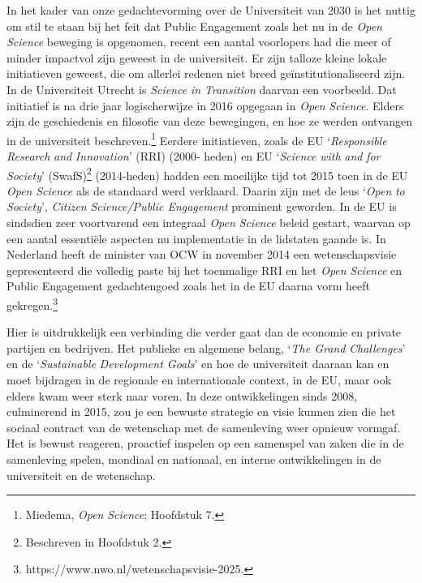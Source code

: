 \documentclass[smallauthor, chapterhaspagenum, nochapterinheader, pagenuminheader,  bigchapnum,medium2, tocpages, garamond, titleinheader]{jote-book}
\begin{document}
	In het kader van onze gedachtevorming over de Universiteit van 2030 is het nuttig om stil te staan bij het feit dat Public Engagement zoals het nu in de \emph{Open }\emph{Science} beweging is opgenomen, recent een aantal voorlopers had die meer of minder impactvol zijn geweest in de universiteit. Er zijn talloze kleine lokale initiatieven geweest, die om allerlei redenen niet breed geïnstitutionaliseerd zijn. In de Universiteit Utrecht is \emph{Science}\emph{ in }\emph{Transition} daarvan een voorbeeld. Dat initiatief is na drie jaar logischerwijze in 2016 opgegaan in \emph{Open }\emph{Science}. Elders zijn de geschiedenis en filosofie van deze bewegingen, en hoe ze werden ontvangen in de universiteit beschreven.\footnote{Miedema, \emph{Open }\emph{Science}; Hoofdstuk 7. } Eerdere initiatieven, zoals de EU ‘\emph{Responsible}\emph{ Research }\emph{and}\emph{ }\emph{Innovation}' (RRI) (2000- heden) en EU ‘\emph{Science}\emph{ }\emph{with}\emph{ }\emph{and}\emph{ }\emph{for}\emph{ Society}' (SwafS)\footnote{Beschreven in Hoofdstuk 2.} (2014-heden) hadden een moeilijke tijd tot 2015 toen in de EU \emph{Open }\emph{Science} als de standaard werd verklaard. Daarin zijn met de leus ‘\emph{Open }\emph{to}\emph{ Society}', \emph{Citizen}\emph{ }\emph{Science}\emph{/Public Engagement} prominent geworden. In de EU is sindsdien zeer voortvarend een integraal \emph{Open }\emph{Science} beleid gestart, waarvan op een aantal essentiële aspecten nu implementatie in de lidstaten gaande is. In Nederland heeft de minister van OCW in november 2014 een wetenschapsvisie gepresenteerd die volledig paste bij het toenmalige RRI en het \emph{Open }\emph{Science} en Public Engagement gedachtengoed zoals het in de EU daarna vorm heeft gekregen.\footnote{https://www.nwo.nl/wetenschapsvisie-2025.}



	Hier is uitdrukkelijk een verbinding die verder gaat dan de economie en private partijen en bedrijven. Het publieke en algemene belang, ‘\emph{The Grand }\emph{Challenges}' en de ‘\emph{Sustainable}\emph{ Development Goals}' en hoe de universiteit daaraan kan en moet bijdragen in de regionale en internationale context, in de EU, maar ook elders kwam weer sterk naar voren. In deze ontwikkelingen sinds 2008, culminerend in 2015, zou je een bewuste strategie en visie kunnen zien die het sociaal contract van de wetenschap met de samenleving weer opnieuw vormgaf. Het is bewust reageren, proactief inspelen op een samenspel van zaken die in de samenleving spelen, mondiaal en nationaal, en interne ontwikkelingen in de universiteit en de wetenschap.
\end{document}
